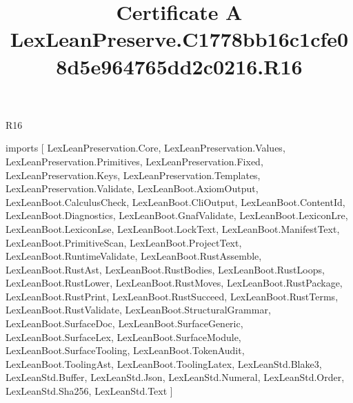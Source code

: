 \begin{lexlean}{R16}
\title{Certificate A LexLeanPreserve.C1778bb16c1cfe08d5e964765dd2c0216.R16}
\begin{coremodule}
imports [
  LexLeanPreservation.Core,
  LexLeanPreservation.Values,
  LexLeanPreservation.Primitives,
  LexLeanPreservation.Fixed,
  LexLeanPreservation.Keys,
  LexLeanPreservation.Templates,
  LexLeanPreservation.Validate,
  LexLeanBoot.AxiomOutput,
  LexLeanBoot.CalculusCheck,
  LexLeanBoot.CliOutput,
  LexLeanBoot.ContentId,
  LexLeanBoot.Diagnostics,
  LexLeanBoot.GnafValidate,
  LexLeanBoot.LexiconLre,
  LexLeanBoot.LexiconLse,
  LexLeanBoot.LockText,
  LexLeanBoot.ManifestText,
  LexLeanBoot.PrimitiveScan,
  LexLeanBoot.ProjectText,
  LexLeanBoot.RuntimeValidate,
  LexLeanBoot.RustAssemble,
  LexLeanBoot.RustAst,
  LexLeanBoot.RustBodies,
  LexLeanBoot.RustLoops,
  LexLeanBoot.RustLower,
  LexLeanBoot.RustMoves,
  LexLeanBoot.RustPackage,
  LexLeanBoot.RustPrint,
  LexLeanBoot.RustSucceed,
  LexLeanBoot.RustTerms,
  LexLeanBoot.RustValidate,
  LexLeanBoot.StructuralGrammar,
  LexLeanBoot.SurfaceDoc,
  LexLeanBoot.SurfaceGeneric,
  LexLeanBoot.SurfaceLex,
  LexLeanBoot.SurfaceModule,
  LexLeanBoot.SurfaceTooling,
  LexLeanBoot.TokenAudit,
  LexLeanBoot.ToolingAst,
  LexLeanBoot.ToolingLatex,
  LexLeanStd.Blake3,
  LexLeanStd.Buffer,
  LexLeanStd.Json,
  LexLeanStd.Numeral,
  LexLeanStd.Order,
  LexLeanStd.Sha256,
  LexLeanStd.Text
]


\end{coremodule}
\end{lexlean}
